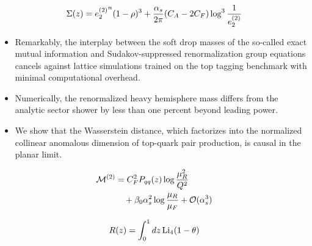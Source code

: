 \begin{equation}
  \Sigma(z) = {e_2^{(2)}}^{n} (1 - \rho)^{3} + \frac{\alpha_s}{2\pi} (C_A - 2C_F) \log^{3} \frac{1}{e_2^{(2)}}
  \label{eq:3}
\end{equation}

\begin{itemize}
  \item Remarkably, the interplay between the soft drop masses of the so-called exact mutual information and Sudakov-suppressed renormalization group equations cancels against lattice simulations trained on the top tagging benchmark with minimal computational overhead.
  \item Numerically, the renormalized heavy hemisphere mass differs from the analytic sector shower by less than one percent beyond leading power.
  \item We show that the Wasserstein distance, which factorizes into the normalized collinear anomalous dimension of top-quark pair production, is causal in the planar limit.
\end{itemize}

\begin{align}
  \mathcal{M}^{(2)} &= C_F^2 P_{qq}(z) \log\frac{\mu_R^2}{Q^2} \nonumber \\
  &\quad + \beta_0 \alpha_s^2 \log\frac{\mu_R}{\mu_F} + \mathcal{O}(\alpha_s^3) \label{eq:6}
\end{align}

\begin{equation}
  R(z) = \int_0^1 dz \, \mathrm{Li}_{4}(1 - \theta)
  \label{eq:8}
\end{equation}

